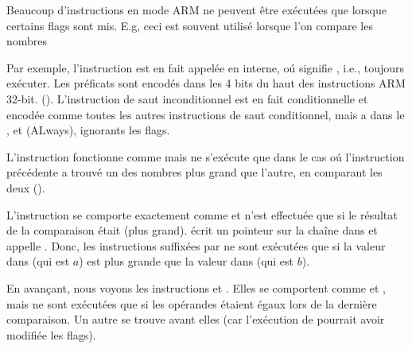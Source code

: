 \label{subsec:jcc_ARM}

\mysubparagraph{\OptimizingKeilVI (\ARMMode)}




Beaucoup d'instructions en mode ARM ne peuvent être exécutées que lorsque certains
flags sont mis.
E.g, ceci est souvent utilisé lorsque l'on compare les nombres


Par exemple, l'instruction \ADD est en fait appelée  en interne, oú 
signifie , i.e., toujours exécuter.
Les préficats sont encodés dans les 4 bits du haut des instructions ARM 32-bit. ().
L'instruction de saut inconditionnel  est en fait conditionnelle et encodée
comme toutes les autres instructions de saut conditionnel, mais a  dans le
, et  (ALways), ignorants les flags.


L'instruction  fonctionne comme  mais ne s'exécute que dans le
cas oú l'instruction \CMP précédente a trouvé un des nombres plus grand que l'autre,
en comparant les deux ().


L'instruction  se comporte exactement comme  et n'est effectuée
que si le résultat de la comparaison était  (plus grand).
 écrit un pointeur sur la chaîne  dans 
et  appelle \printf.
Donc, les instructions suffixées par  ne sont exécutées que si la valeur
dans  (qui est $a$) est plus grande que la valeur dans  (qui est $b$).


En avançant, nous voyons les instructions  et .
Elles se comportent comme  et , mais ne sont exécutées que si les
opérandes étaient égaux lors de la dernière comparaison.
Un autre \CMP se trouve avant elles (car l'exécution de \printf pourrait avoir
modifiée les flags).

